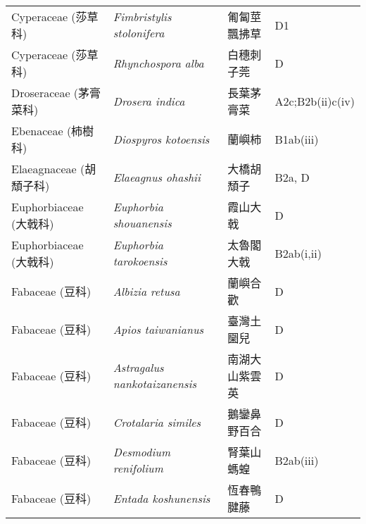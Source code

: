 \begin{longtable}{p{3cm}p{5cm}p{3cm}p{4cm}}
    Cyperaceae (莎草科) & \textit{Fimbristylis stolonifera}  & 匍匐莖飄拂草 & D1 \index{Fimbristylis@\textit{Fimbristylis}!stolonifera@\textit{stolonifera}}  \index{匍匐莖飄拂草} \\
    Cyperaceae (莎草科) & \textit{Rhynchospora alba}  & 白穗刺子莞 & D \index{Rhynchospora@\textit{Rhynchospora}!alba@\textit{alba}}  \index{白穗刺子莞} \\
    Droseraceae (茅膏菜科) & \textit{Drosera indica}  & 長葉茅膏菜 & A2c;B2b(ii)c(iv) \index{Drosera@\textit{Drosera}!indica@\textit{indica}}  \index{長葉茅膏菜} \\
    Ebenaceae (柿樹科) & \textit{Diospyros kotoensis}  & 蘭嶼柿 & B1ab(iii) \index{Diospyros@\textit{Diospyros}!kotoensis@\textit{kotoensis}}  \index{蘭嶼柿} \\
    Elaeagnaceae (胡頹子科) & \textit{Elaeagnus ohashii}  & 大橋胡頹子 & B2a, D \index{Elaeagnus@\textit{Elaeagnus}!ohashii@\textit{ohashii}}  \index{大橋胡頹子} \\
    Euphorbiaceae (大戟科) & \textit{Euphorbia shouanensis}  & 霞山大戟 & D \index{Euphorbia@\textit{Euphorbia}!shouanensis@\textit{shouanensis}}  \index{霞山大戟} \\
    Euphorbiaceae (大戟科) & \textit{Euphorbia tarokoensis}  & 太魯閣大戟 & B2ab(i,ii) \index{Euphorbia@\textit{Euphorbia}!tarokoensis@\textit{tarokoensis}}  \index{太魯閣大戟} \\
    Fabaceae (豆科) & \textit{Albizia retusa}  & 蘭嶼合歡 & D \index{Albizia@\textit{Albizia}!retusa@\textit{retusa}}  \index{蘭嶼合歡} \\
    Fabaceae (豆科) & \textit{Apios taiwanianus}  & 臺灣土圞兒 & D \index{Apios@\textit{Apios}!taiwanianus@\textit{taiwanianus}}  \index{臺灣土圞兒} \\
    Fabaceae (豆科) & \textit{Astragalus nankotaizanensis}  & 南湖大山紫雲英 & D \index{Astragalus@\textit{Astragalus}!nankotaizanensis@\textit{nankotaizanensis}}  \index{南湖大山紫雲英} \\
    Fabaceae (豆科) & \textit{Crotalaria similes}  & 鵝鑾鼻野百合 & D \index{Crotalaria@\textit{Crotalaria}!similes@\textit{similes}}  \index{鵝鑾鼻野百合} \\
    Fabaceae (豆科) & \textit{Desmodium renifolium}  & 腎葉山螞蝗 & B2ab(iii) \index{Desmodium@\textit{Desmodium}!renifolium@\textit{renifolium}}  \index{腎葉山螞蝗} \\
    Fabaceae (豆科) & \textit{Entada koshunensis}  & 恆春鴨腱藤 & D \index{Entada@\textit{Entada}!koshunensis@\textit{koshunensis}}  \index{恆春鴨腱藤} \\

\end{longtable}
